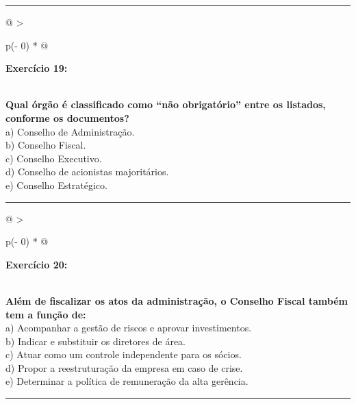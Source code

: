 \documentclass[
]{book}
\begin{document}
\begin{center}\rule{0.5\linewidth}{0.5pt}\end{center}

\begin{longtable}[]{@{}
  >{\raggedright\arraybackslash}p{(\columnwidth - 0\tabcolsep) * }@{}}
\toprule\noalign{}
\begin{minipage}[b]{\linewidth}\raggedright
\textbf{Exercício 19:}
\end{minipage} \\
\midrule\noalign{}
\endhead
\bottomrule\noalign{}
\endlastfoot
\textbf{Qual órgão é classificado como ``não obrigatório'' entre os listados, conforme os documentos?} \\
a) Conselho de Administração. \\
b) Conselho Fiscal. \\
c) Conselho Executivo. \\
d) Conselho de acionistas majoritários. \\
e) Conselho Estratégico. \\
\end{longtable}

\begin{center}\rule{0.5\linewidth}{0.5pt}\end{center}

\begin{longtable}[]{@{}
  >{\raggedright\arraybackslash}p{(\columnwidth - 0\tabcolsep) * }@{}}
\toprule\noalign{}
\begin{minipage}[b]{\linewidth}\raggedright
\textbf{Exercício 20:}
\end{minipage} \\
\midrule\noalign{}
\endhead
\bottomrule\noalign{}
\endlastfoot
\textbf{Além de fiscalizar os atos da administração, o Conselho Fiscal também tem a função de:} \\
a) Acompanhar a gestão de riscos e aprovar investimentos. \\
b) Indicar e substituir os diretores de área. \\
c) Atuar como um controle independente para os sócios. \\
d) Propor a reestruturação da empresa em caso de crise. \\
e) Determinar a política de remuneração da alta gerência. \\
\end{longtable}

\begin{center}\rule{0.5\linewidth}{0.5pt}\end{center}
\end{document}
